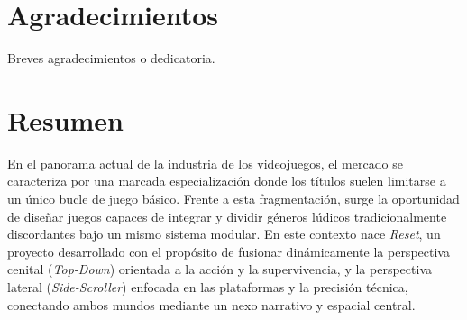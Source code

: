 \documentclass[12pt,twoside,titlepage]{report}
\begin{document}
\pagestyle{plain}





\setlength{\parskip}{0.75em}
\renewcommand{\baselinestretch}{1.25}

\setcounter{page}{2}





\chapter*{Agradecimientos}

Breves agradecimientos o dedicatoria.

\afterpage{\blankpage}




\chapter*{Resumen}

En el panorama actual de la industria de los videojuegos, el mercado se caracteriza por una marcada especialización donde los títulos suelen limitarse a un único bucle de juego básico. Frente a esta fragmentación, surge la oportunidad de diseñar juegos capaces de integrar y dividir géneros lúdicos tradicionalmente discordantes bajo un mismo sistema modular. En este contexto nace \textit{Reset}, un proyecto desarrollado con el propósito de fusionar dinámicamente la perspectiva cenital (\textit{Top-Down}) orientada a la acción y la supervivencia, y la perspectiva lateral (\textit{Side-Scroller}) enfocada en las plataformas y la precisión técnica, conectando ambos mundos mediante un nexo narrativo y espacial central.
\end{document}
